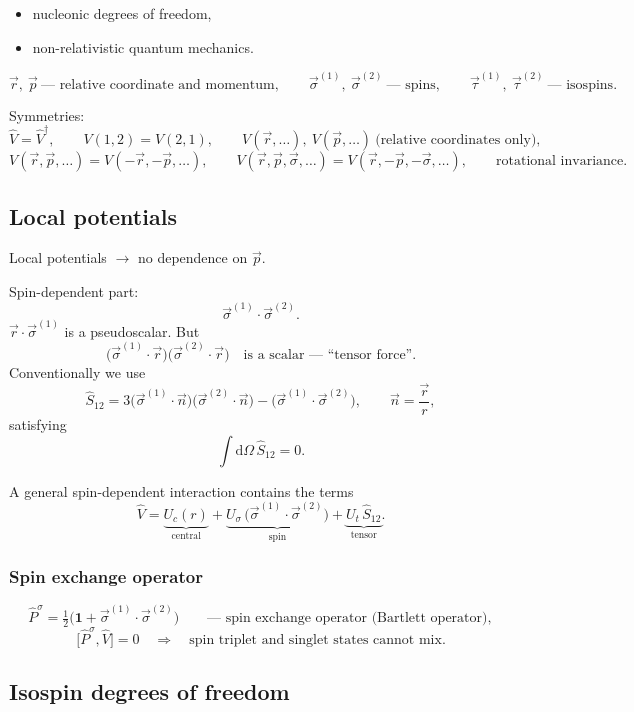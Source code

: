 \documentclass[11pt,a4paper]{article}
\newcommand{\op}[1]{\hat{#1}}
\newcommand{\ud}{\mathrm{d}}
\begin{document}
\begin{itemize}
\item nucleonic degrees of freedom,
\item non-relativistic quantum mechanics.
\end{itemize}

\[
\vec r,\ \vec p \ \text{--- relative coordinate and momentum},\qquad
\vec\sigma^{(1)},\ \vec\sigma^{(2)} \ \text{--- spins},\qquad
\vec\tau^{(1)},\ \vec\tau^{(2)} \ \text{--- isospins}.
\]

Symmetries:
\[
\op V=\op V^\dagger,\qquad
V(1,2)=V(2,1),\qquad
V(\vec r,\dots),\ V(\vec p,\dots)\ \text{(relative coordinates only)},
\]
\[
V(\vec r,\vec p,\dots)=V(-\vec r,-\vec p,\dots),\qquad
V(\vec r,\vec p,\vec\sigma,\dots)=V(\vec r,-\vec p,-\vec\sigma,\dots),\qquad
\text{rotational invariance}.
\]

\subsection{Local potentials}

Local potentials $\to$ no dependence on $\vec p$.

Spin-dependent part:
\[
\vec\sigma^{(1)}\!\cdot\vec\sigma^{(2)} .
\]
$\vec r\cdot\vec\sigma^{(1)}$ is a pseudoscalar. But
\[
\big(\vec\sigma^{(1)}\!\cdot\vec r\big)\big(\vec\sigma^{(2)}\!\cdot\vec r\big)
\quad\text{is a scalar --- ``tensor force''.}
\]
Conventionally we use
\[
\op S_{12}=3\big(\vec\sigma^{(1)}\!\cdot\vec n\big)\big(\vec\sigma^{(2)}\!\cdot\vec n\big)
-\big(\vec\sigma^{(1)}\!\cdot\vec\sigma^{(2)}\big),
\qquad \vec n=\frac{\vec r}{r},
\]
satisfying
\[
\int\!\ud\Omega\,\op S_{12}=0 .
\]

A general spin-dependent interaction contains the terms
\[
\op V=\underbrace{U_c(r)}_{\text{central}}
+\underbrace{U_\sigma\,\big(\vec\sigma^{(1)}\!\cdot\vec\sigma^{(2)}\big)}_{\text{spin}}
+\underbrace{U_t\,\op S_{12}}_{\text{tensor}} .
\]

\subsubsection*{Spin exchange operator}

\[
\op P^\sigma=\tfrac12\big(\mathbf 1+\vec\sigma^{(1)}\!\cdot\vec\sigma^{(2)}\big)
\qquad\text{--- spin exchange operator (Bartlett operator)},
\]
\[
\big[\op P^\sigma,\op V\big]=0
\quad\Rightarrow\quad
\text{spin triplet and singlet states cannot mix.}
\]

\subsection{Isospin degrees of freedom}
\end{document}
